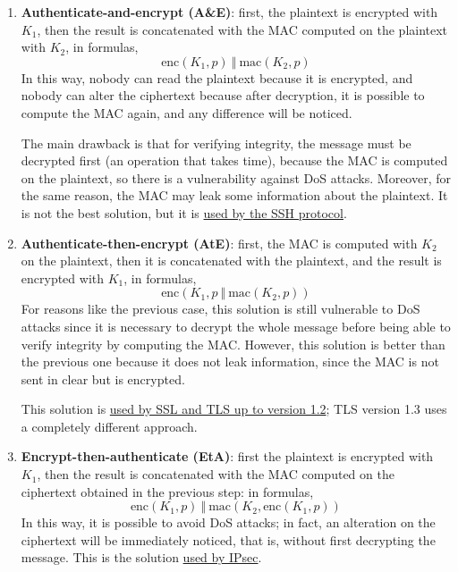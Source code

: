 \begin{enumerate}
    \item \textbf{Authenticate-and-encrypt (A\&E)}: first, the plaintext is encrypted with \(K_1\), then the result is concatenated with the MAC computed on the plaintext with \(K_2\), in formulas, 
    \[\text{enc}(K_1, p)\ \Vert \  \text{mac}(K_2, p)\]
          In this way, nobody can read the plaintext because it is encrypted, and nobody can alter the ciphertext because after decryption, it is possible to compute the MAC again, and any difference will be noticed.

          The main drawback is that for verifying integrity, the message must be decrypted first (an operation that takes time), because the MAC is computed on the plaintext, so there is a vulnerability against DoS attacks. Moreover, for the same reason, the MAC may leak some information about the plaintext. It is not the best solution, but it is \ul{used by the SSH protocol}.

    \item \textbf{Authenticate-then-encrypt (AtE)}: first, the MAC is computed with \(K_2\) on the plaintext, then it is concatenated with the plaintext, and the result is encrypted with \(K_1\), in formulas, \[\text{enc}(K_1, p \ \Vert \ \text{mac}(K_2, p))\]
          For reasons like the previous case, this solution is still vulnerable to DoS attacks since it is necessary to decrypt the whole message before being able to verify integrity by computing the MAC. However, this solution is better than the previous one because it does not leak information, since the MAC is not sent in clear but is encrypted.

          This solution is \underline{used by SSL and TLS up to version 1.2}; TLS version 1.3 uses a completely different approach.

    \item \textbf{Encrypt-then-authenticate (EtA)}: first the plaintext is encrypted with \(K_1\), then the result is
          concatenated with the MAC computed on the ciphertext obtained in the previous step: in formulas,
          \[\text{enc}(K_1, p) \ \Vert \ \text{mac}(K_2, \text{enc}(K_1, p))\]
          In this way, it is possible to avoid DoS attacks; in fact, an alteration on the ciphertext will be immediately noticed, that is, without first decrypting the message.
          This is the solution \underline{used by IPsec}.
\end{enumerate}

